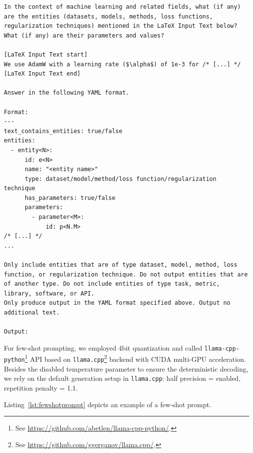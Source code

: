 \begin{lstlisting}[language=plain,caption=Prompt example.,label=lst:promptexample,breaklines=true,captionpos=b,frame=single,showlines=true,basicstyle=\tiny\ttfamily]
In the context of machine learning and related fields, what (if any) are the entities (datasets, models, methods, loss functions, regularization techniques) mentioned in the LaTeX Input Text below? What (if any) are their parameters and values?

[LaTeX Input Text start]
We use AdamW with a learning rate ($\alpha$) of 1e-3 for /* [...] */
[LaTeX Input Text end]

Answer in the following YAML format.

Format:
---
text_contains_entities: true/false
entities:
  - entity<N>:
      id: e<N>
      name: "<entity name>"
      type: dataset/model/method/loss function/regularization technique
      has_parameters: true/false
      parameters:
        - parameter<M>:
            id: p<N.M>
/* [...] */
...

Only include entities that are of type dataset, model, method, loss function, or regularization technique. Do not output entities that are of another type. Do not include entities of type task, metric, library, software, or API.
Only produce output in the YAML format specified above. Output no additional text.

Output:
\end{lstlisting}

For few-shot prompting, we employed 4bit quantization and called \texttt{llama-cpp-python}\footnote{See \url{https://github.com/abetlen/llama-cpp-python/}.} API based on \texttt{llama.cpp}\footnote{See \url{https://github.com/ggerganov/llama.cpp/}.} backend with CUDA multi-GPU acceleration. Besides the disabled temperature parameter to ensure the deterministic decoding, we rely on the default generation setup in \texttt{llama.cpp}: half precision = enabled, repetition penalty = 1.1.


Listing~\ref{lst:fewshotprompt} depicts an example of a few-shot prompt.

